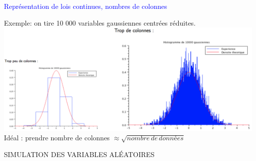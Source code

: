 \begin{Large}
\hspace{2mm} \colorbox{gray!20}{\textcolor{blue}{Représentation de lois continues, nombres de colonnes}}
\end{Large}

\hspace{3mm} Exemple: on tire 10 000 variables gaussiennes centrées réduites.\\
\includegraphics[scale=0.6]{content/Figure2.PNG} \\

\hspace{3mm} Idéal : prendre nombre de colonnes $\approx \sqrt{nombre \, de \, données}$ \\

\begin{center}
\begin{Large}
SIMULATION DES VARIABLES ALÉATOIRES \\
\end{Large}
\end{center}

